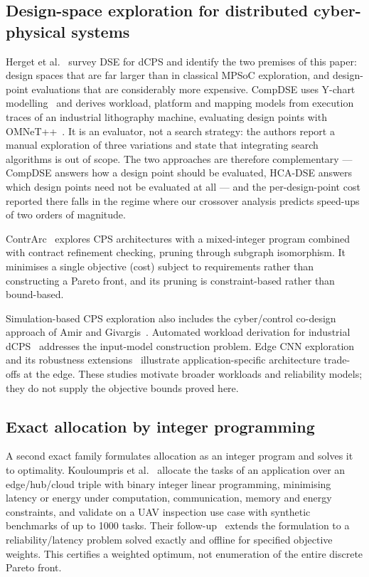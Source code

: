 \subsection{Design-space exploration for distributed cyber-physical systems}
Herget et al.~\cite{herget2022dse} survey DSE for dCPS and identify the two premises of
this paper: design spaces that are far larger than in classical MPSoC exploration, and
design-point evaluations that are considerably more expensive. CompDSE
\cite{saadatmand2025compdse} uses Y-chart modelling~\cite{kienhuis2002ychart}
and derives workload, platform and mapping models from execution traces of an industrial
lithography machine, evaluating design points with OMNeT++~\cite{varga2008omnet}. It is
an evaluator, not a search strategy: the authors report a manual exploration of three
variations and state that integrating search algorithms is out of scope. The two
approaches are therefore complementary --- CompDSE answers how a design point should be
evaluated, HCA-DSE answers which design points need not be evaluated at all --- and the
per-design-point cost reported there falls in the regime where our crossover analysis
predicts speed-ups of two orders of magnitude.

ContrArc~\cite{xiao2024contrarc} explores CPS architectures with a mixed-integer program
combined with contract refinement checking, pruning through subgraph isomorphism. It
minimises a single objective (cost) subject to requirements rather than constructing a
Pareto front, and its pruning is constraint-based rather than bound-based.

Simulation-based CPS exploration also includes the cyber/control co-design approach of
Amir and Givargis~\cite{amir2020pareto}. Automated workload derivation for industrial
dCPS~\cite{saadatmand2024workload} addresses the input-model construction problem.
Edge CNN exploration~\cite{guo2023} and its robustness extensions~\cite{guo2025}
illustrate application-specific architecture trade-offs at the edge. These studies motivate
broader workloads and reliability models; they do not supply the objective bounds proved here.

\subsection{Exact allocation by integer programming}
\label{sec:related:milp}
A second exact family formulates allocation as an integer program and solves it to
optimality. Kouloumpris et al.~\cite{kouloumpris2024optimization} allocate the tasks of
an application over an edge/hub/cloud triple with binary integer linear programming,
minimising latency or energy under computation, communication, memory and energy
constraints, and validate on a UAV inspection use case with synthetic benchmarks of up to
1000 tasks. Their follow-up~\cite{kouloumpris2026reliability} extends the formulation to
a reliability/latency problem solved exactly and offline for specified objective weights. This certifies a weighted optimum, not enumeration of the entire discrete Pareto front.

